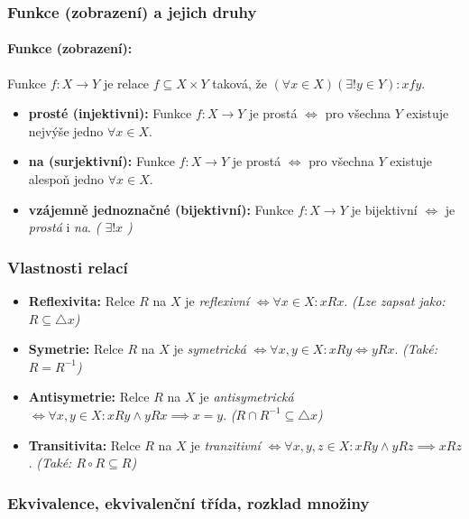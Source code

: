 \documentclass[10pt,a4paper]{article}
\begin{document}
\subsubsection{Funkce (zobrazení) a jejich druhy}

\paragraph*{Funkce (zobrazení):} Funkce $f:X \to Y$ je relace $f \subseteq X\times Y$ taková, že $(\forall x \in X)(\exists !y \in Y): xfy$.

\begin{itemize}
    \item \textbf{prosté (injektivni):}  Funkce $f: X\to Y$ je prostá $\iff$ pro všechna $Y$ existuje nejvýše jedno $\forall x \in X$.
    \item \textbf{na (surjektivní):} Funkce $f: X\to Y$ je prostá $\iff$ pro všechna $Y$ existuje alespoň jedno $\forall x \in X$.
    \item \textbf{vzájemně jednoznačné (bijektivní):} Funkce $f: X\to Y$ je bijektivní $\iff$ je \textit{prostá} i \textit{na}. \textit{( $\exists !x$ )}
\end{itemize}

\subsubsection{Vlastnosti relací}

\begin{itemize}
    \item \textbf{Reflexivita:} Relce $R$ na $X$ je \textit{reflexivní} $\iff \forall x \in X: xRx$. \textit{(Lze zapsat jako: $R \subseteq \triangle x$)}
    \item \textbf{Symetrie:} Relce $R$ na $X$ je \textit{symetrická} $\iff \forall x,y \in X: xRy \iff yRx$. \textit{(Také: $R = R^{-1}$)}
    \item \textbf{Antisymetrie:} Relce $R$ na $X$ je \textit{antisymetrická} $\iff \forall x,y \in X: xRy \land yRx \implies x=y$. \textit{($R \cap R^{-1} \subseteq \triangle x$)}
    \item \textbf{Transitivita:} Relce $R$ na $X$ je \textit{tranzitivní} $\iff \forall x,y,z \in X: xRy \land yRz \implies xRz$. \textit{(Také: $R \circ R \subseteq R$)}
\end{itemize}

\subsubsection{Ekvivalence, ekvivalenční třída, rozklad množiny}
\end{document}
